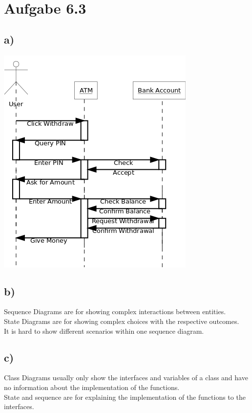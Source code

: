 \documentclass[a4paper,10pt]{scrartcl}[2003/01/01]
\begin{document}
        \newpage
    \section*{Aufgabe 6.3}
        \subsection*{a)}
        \includegraphics[scale=0.5]{Diagram1}
        \subsection*{b)}
        Sequence Diagrams are for showing complex interactions between entities.\\
        State Diagrams are for showing complex choices with the respective outcomes.\\
        
        It is hard to show different scenarios within one sequence diagram.
        \subsection*{c)}
        Class Diagrams usually only show the interfaces and variables of a class and have no information about the implementation of the functions.\\
        State and sequence are for explaining the implementation of the functions to the interfaces.
\end{document}
